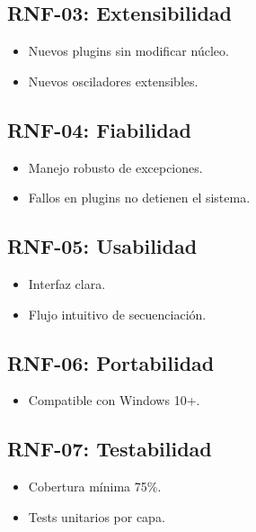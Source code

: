 \documentclass[12pt]{article}
\begin{document}
\subsection{RNF-03: Extensibilidad}

\begin{itemize}
\item Nuevos plugins sin modificar núcleo.
\item Nuevos osciladores extensibles.
\end{itemize}

\subsection{RNF-04: Fiabilidad}

\begin{itemize}
\item Manejo robusto de excepciones.
\item Fallos en plugins no detienen el sistema.
\end{itemize}

\subsection{RNF-05: Usabilidad}

\begin{itemize}
\item Interfaz clara.
\item Flujo intuitivo de secuenciación.
\end{itemize}

\subsection{RNF-06: Portabilidad}

\begin{itemize}
\item Compatible con Windows 10+.
\end{itemize}

\subsection{RNF-07: Testabilidad}

\begin{itemize}
\item Cobertura mínima 75\%.
\item Tests unitarios por capa.
\end{itemize}
\end{document}
